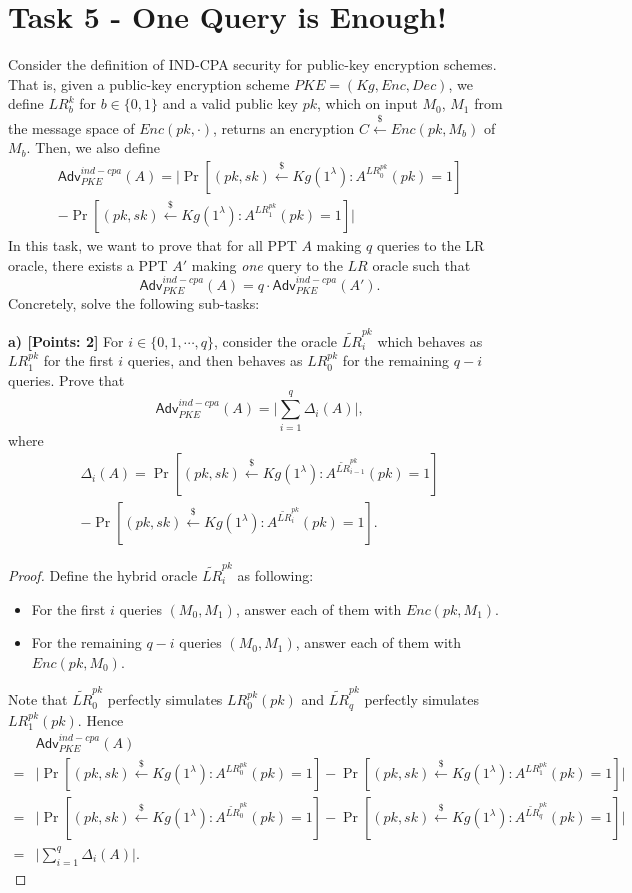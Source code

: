 \documentclass[12pt]{article}
\newcommand{\bits}{\{0,1\}}
\newcommand{\getsr}{\stackrel{\$}{\gets}}
\newcommand{\Adv}{\textsf{Adv}}
\theoremstyle{definition}
\begin{document}
\section{Task 5 - One Query is Enough!}
Consider the definition of IND-CPA security for public-key encryption schemes. That is,
given a public-key encryption scheme $PKE = (Kg, Enc, Dec)$, we define $LR_b^k$ for $b\in\bits$ and a valid public key $pk$, which on input $M_0$, $M_1$ from the message space of $Enc(pk,\cdot)$, returns an encryption $C \getsr Enc(pk, M_b)$ of $M_b$. Then, we also define
$$\begin{aligned}
\Adv_{PKE}^{ind-cpa}(A) = \bigg| \Pr[(pk,sk)\getsr Kg(1^\lambda) : A^{LR_0^{pk}}(pk)=1] \\
-\Pr[(pk,sk)\getsr Kg(1^\lambda) : A^{LR_1^{pk}}(pk)=1] \bigg|
\end{aligned}$$
In this task, we want to prove that for all PPT $A$ making $q$ queries to the LR oracle, there exists a PPT $A'$ making \emph{one} query to the $LR$ oracle such that
\begin{equation}
\label{eq:1}
\Adv_{PKE}^{ind-cpa}(A) = q \cdot \Adv_{PKE}^{ind-cpa}(A').
\end{equation}
Concretely, solve the following sub-tasks:

{\bf a) [Points: 2]} For $i \in \{0,1,\cdots, q\}$, consider the oracle $\widetilde{LR}_i^{pk}$ which behaves as $LR_1^{pk}$ for the first $i$ queries, and then behaves as $LR_0^{pk}$ for the remaining $q-i$ queries. Prove that
$$\Adv_{PKE}^{ind-cpa}(A) = \bigg| \sum_{i=1}^q \Delta_i(A) \bigg|,$$
where
$$\begin{aligned}
\Delta_i(A) = \Pr[(pk,sk)\getsr Kg(1^\lambda) : A^{\widetilde{LR}_{i-1}^{pk}}(pk)=1] \\
- \Pr[(pk,sk)\getsr Kg(1^\lambda) : A^{\widetilde{LR}_{i}^{pk}}(pk)=1].
\end{aligned}$$
\begin{proof}
Define the hybrid oracle $\widetilde{LR}_i^{pk}$ as following: 
\begin{itemize}
\item For the first $i$ queries $(M_0,M_1)$, answer each of them with $Enc(pk, M_1)$.
\item For the remaining $q-i$ queries $(M_0,M_1)$, answer each of them with $Enc(pk, M_0)$.
\end{itemize}
Note that $\widetilde{LR}_0^{pk}$ perfectly simulates $LR_0^{pk}(pk)$ and $\widetilde{LR}_{q}^{pk}$ perfectly simulates $LR_1^{pk}(pk)$.
Hence
$$\begin{aligned}
& \Adv_{PKE}^{ind-cpa}(A) \\
=& \bigg| \Pr[(pk,sk)\getsr Kg(1^\lambda) : A^{LR_0^{pk}}(pk)=1] 
-\Pr[(pk,sk)\getsr Kg(1^\lambda) : A^{LR_1^{pk}}(pk)=1] \bigg|\\
=& \bigg| \Pr[(pk,sk)\getsr Kg(1^\lambda) : A^{\widetilde{LR}_0^{pk}}(pk)=1] 
-\Pr[(pk,sk)\getsr Kg(1^\lambda) : A^{\widetilde{LR}_q^{pk}}(pk)=1] \bigg|\\
=& \bigg| \sum_{i=1}^q \Delta_i(A) \bigg|.
\end{aligned}$$
\end{proof}
\end{document}
